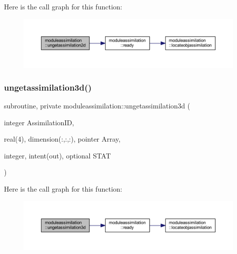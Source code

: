 Here is the call graph for this function\+:\nopagebreak
\begin{figure}[H]
\begin{center}
\leavevmode
\includegraphics[width=350pt]{namespacemoduleassimilation_a3a9adb0b25404594ea0591b684a7c40e_cgraph}
\end{center}
\end{figure}
\mbox{\label{namespacemoduleassimilation_a73155621f7e95b5f4757f4efd48fee01}} 
\subsubsection{\texorpdfstring{ungetassimilation3d()}{ungetassimilation3d()}}
{\footnotesize\ttfamily subroutine, private moduleassimilation\+::ungetassimilation3d (\begin{DoxyParamCaption}\item[{integer}]{Assimilation\+ID,  }\item[{real(4), dimension(\+:,\+:,\+:), pointer}]{Array,  }\item[{integer, intent(out), optional}]{S\+T\+AT }\end{DoxyParamCaption})\hspace{0.3cm}{\ttfamily [private]}}

Here is the call graph for this function\+:\nopagebreak
\begin{figure}[H]
\begin{center}
\leavevmode
\includegraphics[width=350pt]{namespacemoduleassimilation_a73155621f7e95b5f4757f4efd48fee01_cgraph}
\end{center}
\end{figure}
\mbox{\label{namespacemoduleassimilation_a06544a43532e67f29e5ac264d6870860}} 
